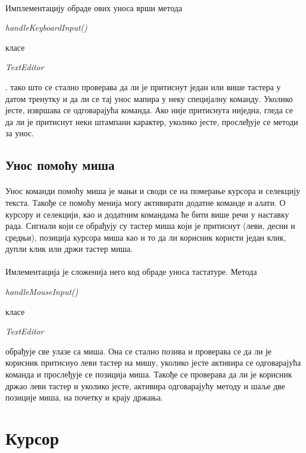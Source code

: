 \documentclass[12pt,oneside]{memoir}
\begin{document}
\paragraph{}
Имплементацију обраде ових уноса врши метода \begin{latinica}\textit{handleKeyboardInput()}\end{latinica} класе
\begin{latinica}\textit{TextEditor}\end{latinica}.
 тако што се стално проверава да ли
је притиснут један или више тастера у датом тренутку и да ли се тај унос мапира у неку специјалну команду. Уколико јесте, извршава се одговарајућа команда. Ако
није притиснута ниједна, гледа се да ли је притиснут неки штампани карактер,
уколико јесте, прослеђује се методи за унос.


\subsection{Унос помоћу миша}
\paragraph{} 
Унос команди помоћу миша је мањи и своди се на померање курсора и селекцију
текста. Такође се помоћу менија могу активирати додатне команде и алати.
О курсору и селекцији, као и додатним командама ће бити више речи у наставку рада.
Сигнали који се обрађују су тастер миша који је притиснут (леви, десни и средњи),
позиција курсора миша као и то да ли корисник користи један клик, дупли клик или
држи тастер миша.

\paragraph{}
Имлементација је сложенија него код обраде уноса тастатуре. Метода
\begin{latinica}\textit{handleMouseInput()}\end{latinica}
класе \begin{latinica}\textit{TextEditor}\end{latinica} обрађује све улазе са
миша. Она се стално позива и проверава се да ли је корисник притиснуо леви тастер на мишу, уколико јесте активира се одговарајућа
команда и прослеђује се позиција миша. Такође се проверава да ли је корисник држао
леви тастер и уколико јесте, активира одговарајућу методу и шаље две позиције миша,
на почетку и крају држања.


\section{Курсор}
\end{document}
